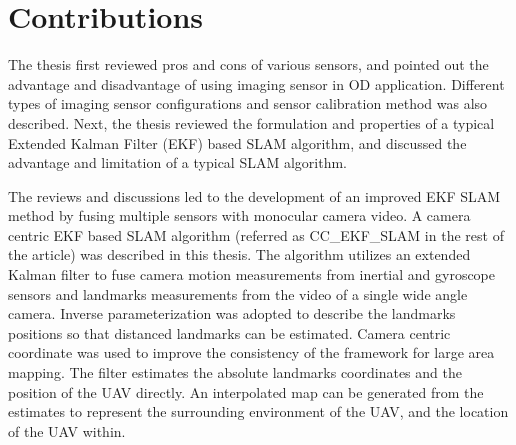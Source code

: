 \section{Contributions}\label{section:Contribution}
The thesis first reviewed pros and cons of various sensors, and
pointed out the advantage and disadvantage of using imaging sensor in
OD application. Different types of imaging sensor configurations and
sensor calibration method was also described. Next, the thesis
reviewed the formulation and properties of a typical Extended Kalman
Filter (EKF) based SLAM algorithm, and discussed the advantage and
limitation of a typical SLAM algorithm.

The reviews and discussions led to the development of an improved EKF
SLAM method by fusing multiple sensors with monocular camera video.
A camera centric EKF based SLAM algorithm (referred as CC\_EKF\_SLAM
in the rest of the article) was described in this thesis. The
algorithm utilizes an extended Kalman filter to fuse camera motion
measurements from inertial and gyroscope sensors and landmarks
measurements from the video of a single wide angle camera. Inverse
parameterization was adopted to describe the landmarks positions so
that distanced landmarks can be estimated. Camera centric coordinate
was used to improve the consistency of the framework for large area
mapping. The filter estimates the absolute landmarks coordinates and
the position of the UAV directly. An interpolated map can be generated
from the estimates to represent the surrounding environment of the
UAV, and the location of the UAV within.

